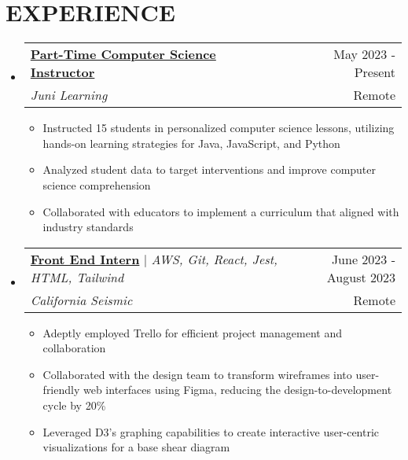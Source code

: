 \documentclass[a4paper,11pt]{article}
\makeatletter
\newcommand{\myuline}[1]{%
  \uline{#1}%
}
\newcommand{\resumeItem}[1]{
  \item\small{
    {#1 \vspace{-3pt}}
  }
}
\newcommand{\resumeSubheading}[4]{
  \vspace{-2pt}\item
    \begin{tabular*}{0.97\textwidth}[t]{l@{\extracolsep{\fill}}r}
      \textbf{#1} & #2 \\
      \textit{\small#3} & \textnormal{\small #4} \\
    \end{tabular*}\vspace{-8pt}
}
\newcommand{\resumeHeadingT}[4]{ %
    \vspace{-2pt} %
    \item
    \begin{tabular*}{0.97\textwidth}{l@{\extracolsep{\fill}}r}
      \small#1 & #2 \\
      \textit{\small#3} & \textnormal{\small #4} \\
    \end{tabular*} \vspace{-15.6pt} %
}
\newcommand{\resumeProjectHeading}[2]{
    \vspace{-2pt} %
    \item
    \begin{tabular*}{0.97\textwidth}{l@{\extracolsep{\fill}}r}
      \small#1 & #2 \\
    \end{tabular*} \vspace{-15.6pt} %
}
\newcommand{\resumeSubHeadingListStart}{\begin{itemize}[leftmargin=0.15in, label={}]}
\newcommand{\resumeSubHeadingListEnd}{\end{itemize}}
\newcommand{\resumeItemListStart}{\begin{itemize}}
\newcommand{\resumeItemListEnd}{\end{itemize}\vspace{-6pt}} %
\makeatother
\begin{document}
\section{ \textbf{EXPERIENCE}}
    \resumeSubHeadingListStart
    \resumeSubheading
      {\myuline{\textbf{Part-Time Computer Science Instructor}}}{May 2023 - Present}
      {Juni Learning}{Remote}
      \resumeItemListStart
            \resumeItem{Instructed 15 students in personalized computer science lessons, utilizing hands-on learning strategies for Java, JavaScript, and Python}
            \resumeItem{Analyzed student data to target interventions and improve computer science comprehension}
            \resumeItem{Collaborated with educators to implement a curriculum that aligned with industry standards}
          \resumeItemListEnd
      \resumeHeadingT
      {{\myuline{\textbf{Front End Intern}}} $|$ \textit{AWS, Git, React, Jest, HTML, Tailwind}}{June 2023 - August 2023}
      {California Seismic}{Remote}
      \resumeItemListStart
            \resumeItem{Adeptly employed Trello for efficient project management and collaboration}
            \resumeItem{Collaborated with the design team to transform wireframes into user-friendly web interfaces using Figma, reducing the design-to-development cycle by 20\%}
            \resumeItem{Leveraged D3's graphing capabilities to create interactive user-centric visualizations for a base shear diagram}
          \resumeItemListEnd
          \resumeSubHeadingListEnd 
          
\end{document}
